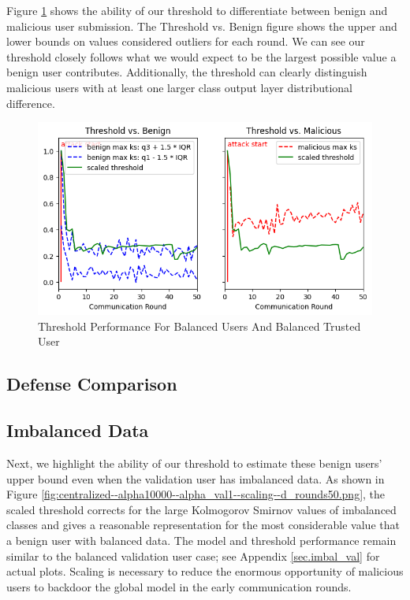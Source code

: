 \documentclass{article} %
\begin{document}
Figure \ref{fig:centralized--alpha10000--alpha_val10000--threshold--n_malicious1--m_start1--d_rounds50} shows the ability of our threshold to differentiate between benign and malicious user submission. The Threshold vs. Benign figure shows the upper and lower bounds on values considered outliers for each round. We can see our threshold closely follows what we would expect to be the largest possible value a benign user contributes. Additionally, the threshold can clearly distinguish malicious users with at least one larger class output layer distributional difference. 

\begin{figure}[H]
    \centering
    \includegraphics[width=.75\textwidth]{01_trusted/centralized/alpha10000--alpha_val10000/visuals/threshold--n_malicious1--m_start1--d_rounds50.png}
    \caption{Threshold Performance For Balanced Users And Balanced Trusted User}
    \label{fig:centralized--alpha10000--alpha_val10000--threshold--n_malicious1--m_start1--d_rounds50}
\end{figure}

\subsection{Defense Comparison}

\subsection{Imbalanced Data}

Next, we highlight the ability of our threshold to estimate these benign users' upper bound even when the validation user has imbalanced data. As shown in Figure \ref{fig:centralized--alpha10000--alpha_val1--scaling--d_rounds50.png}, the scaled threshold corrects for the large Kolmogorov Smirnov values of imbalanced classes and gives a reasonable representation for the most considerable value that a benign user with balanced data. The model and threshold performance remain similar to the balanced validation user case; see Appendix \ref{sec.imbal_val} for actual plots. Scaling is necessary to reduce the enormous opportunity of malicious users to backdoor the global model in the early communication rounds.
\end{document}
